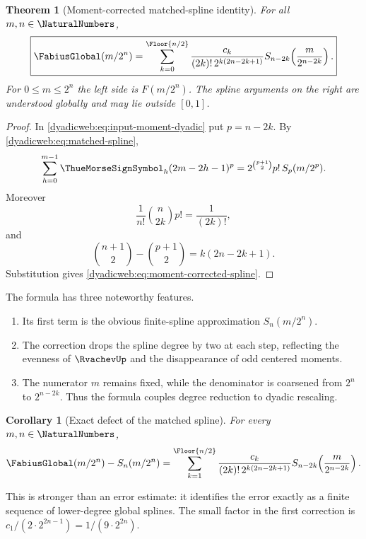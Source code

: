 \documentclass[11pt,oneside]{article}
\newtheorem{theorem}{Theorem}[section]
\newtheorem{corollary}[corollary]{Corollary}
\theoremstyle{definition}
\theoremstyle{remark}
\begin{document}
\begin{theorem}[Moment-corrected matched-spline identity]
\label{dyadicweb:thm:moment-corrected-spline}
For all $m,n\in\NaturalNumbers$,
\begin{equation}
 \boxed{
 \FabiusGlobal(m/2^n)=
 \sum_{k=0}^{\Floor{n/2}}
 \frac{c_k}{(2k)!\,2^{k(2n-2k+1)}}
 S_{n-2k}\!\left(\frac{m}{2^{n-2k}}\right).}              \label{dyadicweb:eq:moment-corrected-spline}
\end{equation}
For $0\le m\le2^n$ the left side is $F(m/2^n)$.  The spline arguments on the right are
understood globally and may lie outside $[0,1]$.
\end{theorem}

\begin{proof}
In \eqref{dyadicweb:eq:input-moment-dyadic} put $p=n-2k$.  By
\eqref{dyadicweb:eq:matched-spline},
\[
 \sum_{h=0}^{m-1}\ThueMorseSignSymbol_h(2m-2h-1)^p
 =2^{\binom{p+1}{2}}p!\,S_p(m/2^p).
\]
Moreover
\[
 \frac1{n!}\binom n{2k}p!=\frac1{(2k)!},
\]
and
\[
 \binom{n+1}{2}-\binom{p+1}{2}=k(2n-2k+1).
\]
Substitution gives \eqref{dyadicweb:eq:moment-corrected-spline}.
\end{proof}

The formula has three noteworthy features.
\begin{enumerate}
\item Its first term is the obvious finite-spline approximation $S_n(m/2^n)$.
\item The correction drops the spline degree by two at each step, reflecting the evenness of
      $\RvachevUp$ and the disappearance of odd centered moments.
\item The numerator $m$ remains fixed, while the denominator is coarsened from $2^n$ to
      $2^{n-2k}$.  Thus the formula couples degree reduction to dyadic rescaling.
\end{enumerate}

\begin{corollary}[Exact defect of the matched spline]
\label{dyadicweb:cor:matched-defect}
For every $m,n\in\NaturalNumbers$,
\begin{equation}
 \FabiusGlobal(m/2^n)-S_n(m/2^n)
 =\sum_{k=1}^{\Floor{n/2}}
 \frac{c_k}{(2k)!\,2^{k(2n-2k+1)}}
 S_{n-2k}\!\left(\frac{m}{2^{n-2k}}\right).               \label{dyadicweb:eq:matched-defect}
\end{equation}
\end{corollary}

This is stronger than an error estimate: it identifies the error exactly as a finite sequence
of lower-degree global splines.  The small factor in the first correction is
$c_1/(2\cdot2^{2n-1})=1/(9\cdot2^{2n})$.
\end{document}

